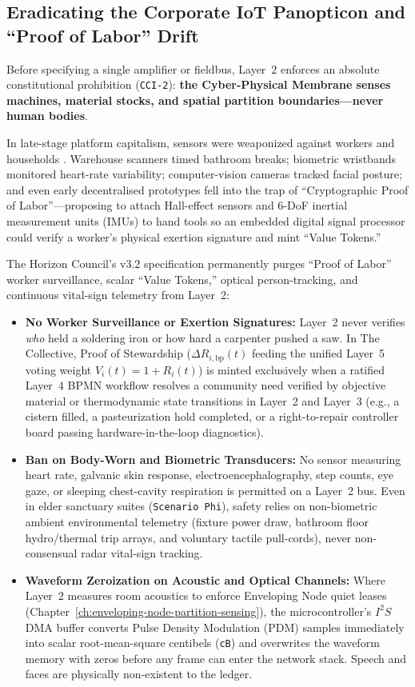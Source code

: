 \subsection{Eradicating the Corporate IoT Panopticon and ``Proof of Labor'' Drift}

Before specifying a single amplifier or fieldbus, Layer~2 enforces an absolute constitutional prohibition (\texttt{CCI-2}): \textbf{the Cyber-Physical Membrane senses machines, material stocks, and spatial partition boundaries---never human bodies}.

In late-stage platform capitalism, sensors were weaponized against workers and households \parencite{zuboff2019,han2015}. Warehouse scanners timed bathroom breaks; biometric wristbands monitored heart-rate variability; computer-vision cameras tracked facial posture; and even early decentralised prototypes fell into the trap of ``Cryptographic Proof of Labor''---proposing to attach Hall-effect sensors and 6-DoF inertial measurement units (IMUs) to hand tools so an embedded digital signal processor could verify a worker's physical exertion signature and mint ``Value Tokens.''

The Horizon Council's v3.2 specification permanently purges ``Proof of Labor'' worker surveillance, scalar ``Value Tokens,'' optical person-tracking, and continuous vital-sign telemetry from Layer~2:
\begin{itemize}
    \item \textbf{No Worker Surveillance or Exertion Signatures:} Layer~2 never verifies \textit{who} held a soldering iron or how hard a carpenter pushed a saw. In The Collective, Proof of Stewardship ($\Delta R_{i,\mathrm{bp}}(t)$ feeding the unified Layer~5 voting weight $V_i(t) = 1 + R_i(t)$) is minted exclusively when a ratified Layer~4 BPMN workflow resolves a community need verified by objective material or thermodynamic state transitions in Layer~2 and Layer~3 (e.g., a cistern filled, a pasteurization hold completed, or a right-to-repair controller board passing hardware-in-the-loop diagnostics).
    \item \textbf{Ban on Body-Worn and Biometric Transducers:} No sensor measuring heart rate, galvanic skin response, electroencephalography, step counts, eye gaze, or sleeping chest-cavity respiration is permitted on a Layer~2 bus. Even in elder sanctuary suites (\texttt{Scenario Phi}), safety relies on non-biometric ambient environmental telemetry (fixture power draw, bathroom floor hydro/thermal trip arrays, and voluntary tactile pull-cords), never non-consensual radar vital-sign tracking.
    \item \textbf{Waveform Zeroization on Acoustic and Optical Channels:} Where Layer~2 measures room acoustics to enforce Enveloping Node quiet leases (Chapter~\ref{ch:enveloping-node-partition-sensing}), the microcontroller's $I^2S$ DMA buffer converts Pulse Density Modulation (PDM) samples immediately into scalar root-mean-square centibels (\texttt{cB}) and overwrites the waveform memory with zeros before any frame can enter the network stack. Speech and faces are physically non-existent to the ledger.
\end{itemize}

